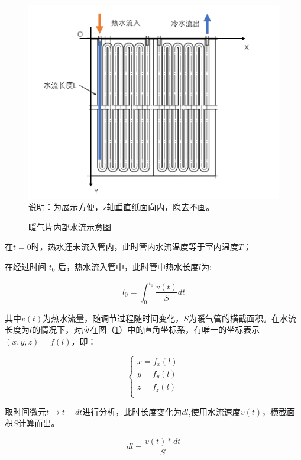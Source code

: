 \documentclass{my_paper}
\begin{document}
\begin {figure}[h]
\centering %
\includegraphics[width=\textwidth]{nuanqipian.png}
说明：为展示方便，z轴垂直纸面向内，隐去不画。
\caption{暖气片内部水流示意图} %
\label{nuanqipian}
\end {figure}

在$ t=0 $时，热水还未流入管内，此时管内水流温度等于室内温度$ T $；

在经过时间 $t_0$ 后，热水流入管中，此时管中热水长度$l$为:

\begin{equation}
l_0 = \int^{t_0}_{0}\frac{v(t)}{S}dt
\end{equation}

其中$ v(t) $为热水流量，随调节过程随时间变化，$ S $为暖气管的横截面积。在水流长度为$ l $的情况下，对应在图（\ref{nuanqipian}）中的直角坐标系，有唯一的坐标表示$(x,y,z)=f(l)$，即：

\begin{equation}
\begin{cases}
    x = f_x(l)\\
    y = f_y(l)\\
    z = f_z(l)\\
\end{cases}
\end{equation}

取时间微元$ t\to t+dt $进行分析，此时长度变化为$dl$,使用水流速度$v(t)$，横截面积$S$计算而出。

\begin{equation}
    dl = \frac{v(t)*dt}{S}
\end{equation}
\end{document}
